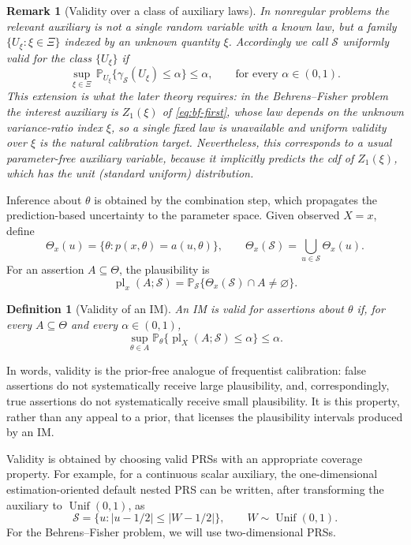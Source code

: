 \documentclass[12pt]{article}
\newtheorem{definition}{Definition}
\newtheorem{remark}{Remark}
\newcommand{\Prb}{\mathbb P}
\newcommand{\pl}{\operatorname{pl}}
\newcommand{\Unif}{\operatorname{Unif}}
\begin{document}
\begin{remark}[Validity over a class of auxiliary laws]
\label{rem:prs-valid-class}
In nonregular problems the relevant auxiliary is not a single random variable
with a known law, but a family \(\{U_\xi:\xi\in\Xi\}\) indexed by an unknown
quantity \(\xi\).  Accordingly we call \(\mathcal S\) \emph{uniformly valid} for
the class \(\{U_\xi\}\) if
\[
\sup_{\xi\in\Xi}\,
\Prb_{U_\xi}\{\gamma_{\mathcal S}(U_\xi)\leq\alpha\}\leq\alpha,
\qquad\text{for every }\alpha\in(0,1).
\]
This extension is what the later theory requires: in the Behrens--Fisher problem
the interest auxiliary is \(Z_1(\xi)\) of
\eqref{eq:bf-first}, whose law depends on the unknown variance-ratio index
\(\xi\), so a single fixed law is unavailable and uniform validity over
\(\xi\) is the natural calibration target.  Nevertheless, this corresponds to a
usual parameter-free auxiliary variable, because it implicitly predicts the cdf
of \(Z_1(\xi)\), which has the unit (standard uniform) distribution.
\end{remark}

Inference about \(\theta\) is obtained by the combination step, which propagates
the prediction-based uncertainty to the parameter space.  Given observed
\(X=x\), define
\[
\Theta_x(u)=\{\theta:p(x,\theta)=a(u,\theta)\},
\qquad
\Theta_x(\mathcal S)=\bigcup_{u\in\mathcal S}\Theta_x(u).
\]
For an assertion \(A\subseteq\Theta\), the plausibility is
\[
\pl_x(A;\mathcal S)
=
\Prb_{\mathcal S}\{\Theta_x(\mathcal S)\cap A\neq\varnothing\}.
\]

\begin{definition}[Validity of an IM]
\label{def:im-valid}
An IM is valid for assertions about \(\theta\) if, for every
\(A\subseteq\Theta\) and every \(\alpha\in(0,1)\),
\[
\sup_{\theta\in A}
\Prb_{\theta}\{\pl_X(A;\mathcal S)\leq \alpha\}
\leq \alpha.
\]
\end{definition}

In words, validity is the prior-free analogue of frequentist calibration: false
assertions do not systematically receive large plausibility, and, correspondingly,
true assertions do not systematically receive small plausibility.  It is this
property, rather than any appeal to a prior, that licenses the plausibility
intervals produced by an IM.

Validity is obtained by choosing valid PRSs with an appropriate
coverage property.  For example, for a continuous scalar auxiliary, the
one-dimensional estimation-oriented default nested PRS can be written, after
transforming the auxiliary to \(\Unif(0,1)\), as
\[
\mathcal S=\{u:|u-1/2|\leq |W-1/2|\},\qquad W\sim \Unif(0,1).
\]
For the Behrens--Fisher problem, we will use two-dimensional PRSs.
\end{document}
